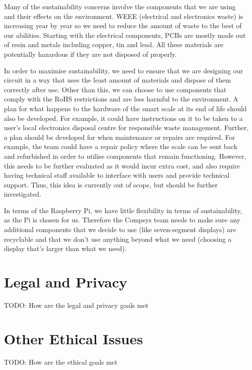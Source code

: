 Many of the sustainability concerns involve the components that we are using and their effects on the environment. WEEE (electrical and electronics waste) is increasing year by year so we need to reduce the amount of waste to the best of our abilities. Starting with the electrical components, PCBs are mostly made out of resin and metals including copper, tin and lead. All these materials are potentially hazardous if they are not disposed of properly.

In order to maximise sustainability, we need to ensure that we are designing our circuit in a way that uses the least amount of materials and dispose of them correctly after use. Other than this, we can choose to use components that comply with the RoHS restrictions and are less harmful to the environment. A plan for what happens to the hardware of the smart scale at its end of life should also be developed. For example, it could have instructions on it to be taken to a user’s local electronics disposal centre for responsible waste management. Further, a plan should be developed for when maintenance or repairs are required. For example, the team could have a repair policy where the scale can be sent back and refurbished in order to utilise components that remain functioning. However, this needs to be further evaluated as it would incur extra cost, and also require having technical staff available to interface with users and provide technical support. Thus, this idea is currently out of scope, but should be further investigated.

In terms of the Raspberry Pi, we have little flexibility in terms of sustainability, as the Pi is chosen for us. Therefore the Compsys team needs to make sure any additional components that we decide to use (like seven-segment displays) are recyclable and that we don’t use anything beyond what we need (choosing a display that’s larger than what we need). 


\section{Legal and Privacy}

TODO: How are the legal and privacy goals met

\section{Other Ethical Issues}

TODO: How are the ethical goals met

